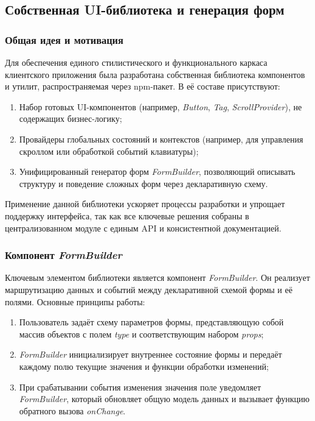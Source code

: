 \subsection{Собственная UI-библиотека и генерация форм}

\subsubsection{Общая идея и мотивация}
Для обеспечения единого стилистического и функционального каркаса клиентского приложения была разработана собственная библиотека компонентов и утилит, распространяемая через npm-пакет. В её составе присутствуют:
\begin{enumerate}
  \item Набор готовых UI-компонентов (например, \textit{Button}, \textit{Tag}, \textit{ScrollProvider}), не содержащих бизнес-логику;
  \item Провайдеры глобальных состояний и контекстов (например, для управления скроллом или обработкой событий клавиатуры);
  \item Унифицированный генератор форм \textit{FormBuilder}, позволяющий описывать структуру и поведение сложных форм через декларативную схему.
\end{enumerate}
Применение данной библиотеки ускоряет процессы разработки и упрощает поддержку интерфейса, так как все ключевые решения собраны в централизованном модуле с единым API и консистентной документацией.

\subsubsection{Компонент \textit{FormBuilder}}
Ключевым элементом библиотеки является компонент \textit{FormBuilder}. Он реализует маршрутизацию данных и событий между декларативной схемой формы и её полями. Основные принципы работы:
\begin{enumerate}
  \item Пользователь задаёт схему параметров формы, представляющую собой массив объектов с полем \textit{type} и соответствующим набором \textit{props};
  \item \textit{FormBuilder} инициализирует внутреннее состояние формы и передаёт каждому полю текущие значения и функции обработки изменений;
  \item При срабатывании события изменения значения поле уведомляет \textit{FormBuilder}, который обновляет общую модель данных и вызывает функцию обратного вызова \textit{onChange}.
\end{enumerate}

